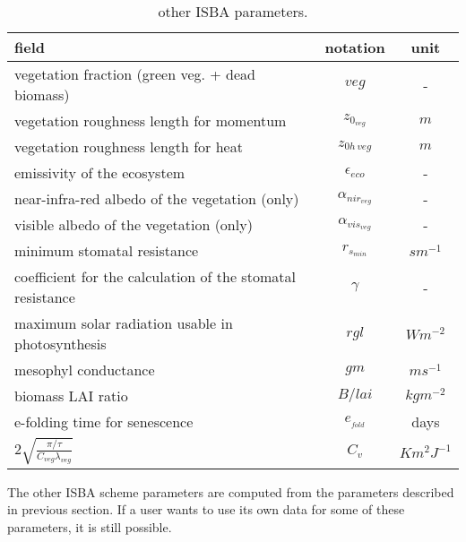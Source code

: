 \begin{table}[h]
\hspace*{0.cm}
\begin{tabular}{||l|c|c||}
\hline
\hline
field & notation &  unit \\
\hline
\hline
vegetation fraction (green veg. + dead biomass) & $veg$ & - \\
vegetation roughness length for momentum & $z_{0_{veg}}$ & $m$ \\
vegetation roughness length for heat & $z_{0h\, veg}$ & $m$ \\
emissivity of the ecosystem & $\epsilon_{eco}$ & - \\
near-infra-red albedo of the vegetation (only) &$\alpha_{{nir}_{veg}}$ &  - \\
visible albedo of the vegetation (only) &$\alpha_{{vis}_{veg}}$ &  - \\
minimum stomatal resistance &$r_{s_{min}}$ &  $sm^{-1}$ \\
coefficient for the calculation of the stomatal resistance &$\gamma$ &  - \\
maximum solar radiation usable in photosynthesis &$rgl$ & $Wm^{-2}$ \\
mesophyl conductance &$gm$ &  $ms^{-1}$ \\
biomass LAI ratio &$B/lai$ &  $kgm^{-2}$ \\
e-folding time for senescence &$e_{_{fold}}$&  days \\
$2\sqrt{\frac{\pi/\tau}{C_{veg}\lambda_{veg}}}$ &$C_v$& $Km^2J^{-1}$ \\
\hline
\hline
\end{tabular}
\caption{other ISBA parameters.
\label{paramISBA2}}
\end{table}

The other ISBA scheme parameters
are computed from the parameters described in previous section.
If a user wants to use its own data for some of these parameters,
it is still possible.

